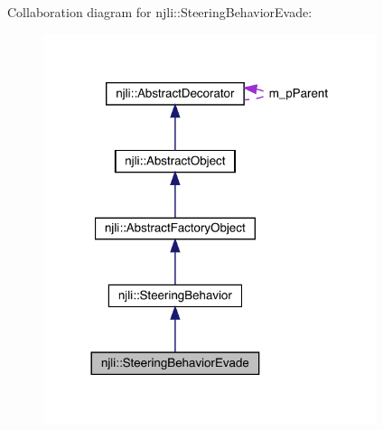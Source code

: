 Collaboration diagram for njli\+:\+:Steering\+Behavior\+Evade\+:\nopagebreak
\begin{figure}[H]
\begin{center}
\leavevmode
\includegraphics[width=276pt]{classnjli_1_1_steering_behavior_evade__coll__graph}
\end{center}
\end{figure}
